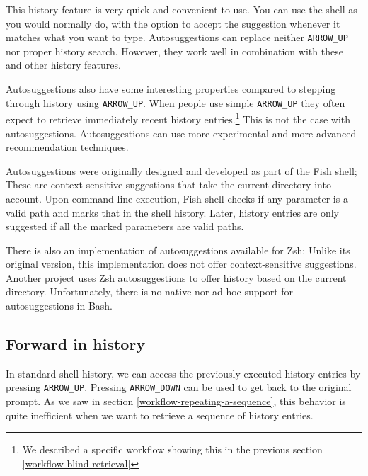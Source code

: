 This history feature is very quick and convenient to use. You can use the shell as you would normally do, with the option to accept the suggestion whenever it matches what you want to type. Autosuggestions can replace neither \verb|ARROW_UP| nor proper history search. However, they work well in combination with these and other history features.

Autosuggestions also have some interesting properties compared to stepping through history using \verb|ARROW_UP|.
When people use simple \verb|ARROW_UP| they often expect to retrieve immediately recent history entries.\footnote{We described a specific workflow showing this in the previous section \ref{workflow-blind-retrieval}} This is not the case with autosuggestions. %
Autosuggestions can use more experimental and more advanced recommendation techniques.

Autosuggestions were originally designed and developed as part of the Fish\cite{fishdocs} shell; These are context-sensitive suggestions that take the current directory into account. Upon command line execution, Fish shell checks if any parameter is a valid path and marks that in the shell history. Later, history entries are only suggested if all the marked parameters are valid paths\cite{toolsfishissueautosuggestions}.

There is also an implementation of autosuggestions available for Zsh\cite{toolszshautosuggestions}; Unlike its original version, this implementation does not offer context-sensitive suggestions. Another project\cite{toolszshhistdb} uses Zsh autosuggestions to offer history based on the current directory.
Unfortunately, there is no native nor ad-hoc support for autosuggestions in Bash. 



\subsection{Forward in history}

In standard shell history, we can access the previously executed history entries by pressing \verb|ARROW_UP|. Pressing \verb|ARROW_DOWN| can be used to get back to the original prompt.
As we saw in section \ref{workflow-repeating-a-sequence}, this behavior is quite inefficient when we want to retrieve a sequence of history entries.

